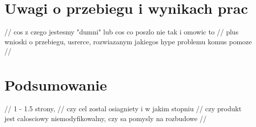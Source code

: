 \newpage
\section{Uwagi o przebiegu i wynikach prac}

// cos z czego jestesmy "dumni" lub cos co poszlo nie tak i omowic to
// plus wnioski o przebiegu, usrerce, rozwiazanym jakiegos hype problemu komus pomoze
// 

\newpage
\section{Podsumowanie}

// 1  - 1.5 strony,
// czy cel zostal osiagniety i w jakim stopniu
// czy produkt jest calosciowy niemodyfikowalny, czy sa pomysly na rozbudowe
// 

